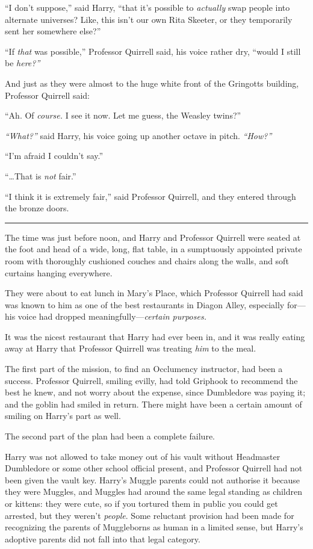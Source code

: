 ``I don't suppose,'' said Harry, ``that it's possible to \emph{actually}
swap people into alternate universes? Like, this isn't our own Rita
Skeeter, or they temporarily sent her somewhere else?''

``If \emph{that} was possible,'' Professor Quirrell said, his voice
rather dry, ``would I still be \emph{here?''}

And just as they were almost to the huge white front of the Gringotts
building, Professor Quirrell said:

``Ah. Of \emph{course.} I see it now. Let me guess, the Weasley twins?''

\emph{``What?''} said Harry, his voice going up another octave in pitch.
\emph{``How?''}

``I'm afraid I couldn't say.''

``\ldots{}That is \emph{not} fair.''

``I think it is extremely fair,'' said Professor Quirrell, and they
entered through the bronze doors.

\begin{center}\rule{3in}{0.4pt}\end{center}

The time was just before noon, and Harry and Professor Quirrell were
seated at the foot and head of a wide, long, flat table, in a
sumptuously appointed private room with thoroughly cushioned couches and
chairs along the walls, and soft curtains hanging everywhere.

They were about to eat lunch in Mary's Place, which Professor Quirrell
had said was known to him as one of the best restaurants in Diagon
Alley, especially for---his voice had dropped
meaningfully---\emph{certain purposes.}

It was the nicest restaurant that Harry had ever been in, and it was
really eating away at Harry that Professor Quirrell was treating
\emph{him} to the meal.

The first part of the mission, to find an Occlumency instructor, had
been a success. Professor Quirrell, smiling evilly, had told Griphook to
recommend the best he knew, and not worry about the expense, since
Dumbledore was paying it; and the goblin had smiled in return. There
might have been a certain amount of smiling on Harry's part as well.

The second part of the plan had been a complete failure.

Harry was not allowed to take money out of his vault without Headmaster
Dumbledore or some other school official present, and Professor Quirrell
had not been given the vault key. Harry's Muggle parents could not
authorise it because they were Muggles, and Muggles had around the same
legal standing as children or kittens: they were cute, so if you
tortured them in public you could get arrested, but they weren't
\emph{people}. Some reluctant provision had been made for recognizing
the parents of Muggleborns as human in a limited sense, but Harry's
adoptive parents did not fall into that legal category.

